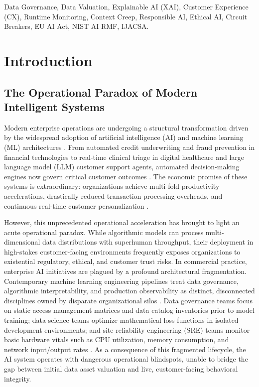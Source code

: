 \documentclass[journal]{IEEEtran}
\begin{document}
\begin{IEEEkeywords}
Data Governance, Data Valuation, Explainable AI (XAI), Customer Experience (CX), Runtime Monitoring, Context Creep, Responsible AI, Ethical AI, Circuit Breakers, EU AI Act, NIST AI RMF, IJACSA.
\end{IEEEkeywords}

\section{Introduction}

\subsection{The Operational Paradox of Modern Intelligent Systems}
Modern enterprise operations are undergoing a structural transformation driven by the widespread adoption of artificial intelligence (AI) and machine learning (ML) architectures \cite{pei2020survey, janssen2020data}. From automated credit underwriting and fraud prevention in financial technologies to real-time clinical triage in digital healthcare and large language model (LLM) customer support agents, automated decision-making engines now govern critical customer outcomes \cite{ghorbani2019data, jia2019towards}. The economic promise of these systems is extraordinary: organizations achieve multi-fold productivity accelerations, drastically reduced transaction processing overheads, and continuous real-time customer personalization \cite{al2017data, khatri2010designing}.

However, this unprecedented operational acceleration has brought to light an acute operational paradox. While algorithmic models can process multi-dimensional data distributions with superhuman throughput, their deployment in high-stakes customer-facing environments frequently exposes organizations to existential regulatory, ethical, and customer trust risks. In commercial practice, enterprise AI initiatives are plagued by a profound architectural fragmentation. Contemporary machine learning engineering pipelines treat data governance, algorithmic interpretability, and production observability as distinct, disconnected disciplines owned by disparate organizational silos \cite{agarwal2019marketplace, chen2022data}. Data governance teams focus on static access management matrices and data catalog inventories prior to model training; data science teams optimize mathematical loss functions in isolated development environments; and site reliability engineering (SRE) teams monitor basic hardware vitals such as CPU utilization, memory consumption, and network input/output rates \cite{laney2017infonomics, micheli2020emerging}. As a consequence of this fragmented lifecycle, the AI system operates with dangerous operational blindspots, unable to bridge the gap between initial data asset valuation and live, customer-facing behavioral integrity.
\end{document}
